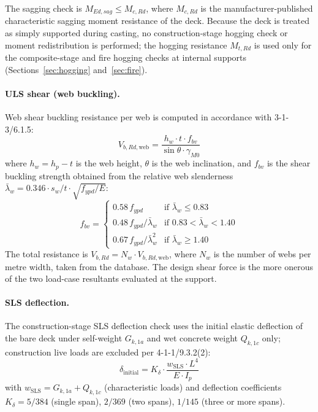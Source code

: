 The sagging check is $M_{Ed,sag} \le M_{c,Rd}$, where $M_{c,Rd}$ is the manufacturer-published characteristic sagging moment resistance of the deck. Because the deck is treated as simply supported during casting, no construction-stage hogging check or moment redistribution is performed; the hogging resistance $M_{t,Rd}$ is used only for the composite-stage and fire hogging checks at internal supports (Sections~\ref{sec:hogging} and~\ref{sec:fire}).

\paragraph{ULS shear (web buckling).} Web shear buckling resistance per web is computed in accordance with 3-1-3/6.1.5:
\begin{equation}
    V_{b,Rd,\mathrm{web}} = \frac{h_w \cdot t \cdot f_{bv}}{\sin\theta \cdot \gamma_{M0}}
    \label{eq:web_shear}
\end{equation}
where $h_w = h_p - t$ is the web height, $\theta$ is the web inclination, and $f_{bv}$ is the shear buckling strength obtained from the relative web slenderness $\bar{\lambda}_w = 0.346 \cdot s_w / t \cdot \sqrt{f_{ypd}/E}$:
\begin{equation}
    f_{bv} =
    \begin{cases}
    0.58\,f_{ypd} & \text{if } \bar{\lambda}_w \le 0.83 \\
    0.48\,f_{ypd}/\bar{\lambda}_w & \text{if } 0.83 < \bar{\lambda}_w < 1.40 \\
    0.67\,f_{ypd}/\bar{\lambda}_w^2 & \text{if } \bar{\lambda}_w \ge 1.40
    \end{cases}
    \label{eq:fbv}
\end{equation}
The total resistance is $V_{b,Rd} = N_w \cdot V_{b,Rd,\mathrm{web}}$, where $N_w$ is the number of webs per metre width, taken from the database. The design shear force is the more onerous of the two load-case resultants evaluated at the support.

\paragraph{SLS deflection.} The construction-stage SLS deflection check uses the initial elastic deflection of the bare deck under self-weight $G_{k,1a}$ and wet concrete weight $Q_{k,1c}$ only; construction live loads are excluded per 4-1-1/9.3.2(2):
\begin{equation}
    \delta_\mathrm{initial} = K_\delta \cdot \frac{w_\mathrm{SLS} \cdot L^4}{E \cdot I_p}
    \label{eq:constr_defl}
\end{equation}
with $w_\mathrm{SLS} = G_{k,1a} + Q_{k,1c}$ (characteristic loads) and deflection coefficients $K_\delta = 5/384$ (single span), $2/369$ (two spans), $1/145$ (three or more spans). 

